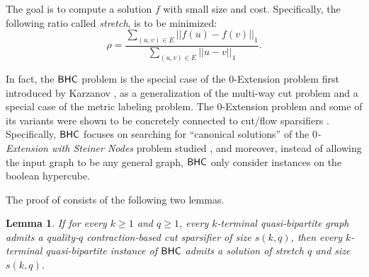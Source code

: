 \documentclass[11pt]{article}
\newtheorem{lemma}[theorem]{Lemma}
\theoremstyle{definition}
\begin{document}
The goal is to compute a solution $f$ with small size and cost. Specifically, the following ratio called \emph{stretch}, is to be minimized:
\[\rho=\frac{\sum_{(u,v)\in E}||f(u)-f(v)||_1}{\sum_{(u,v)\in E}||u-v||_1}.\]

In fact, the $\textnormal{\textsf{BHC}}$ problem is the special case of the $0$-Extension problem first introduced by Karzanov \cite{karzanov1998minimum}, as a generalization of the multi-way cut problem and a special case of the metric labeling problem.
The $0$-Extension problem and some of its variants were shown to be concretely connected to cut/flow sparsifiers \cite{moitra2009approximation,leighton2010extensions,andoni2014towards,chen2024lower,chen20241+}. Specifically, $\textnormal{\textsf{BHC}}$ focuses on searching for ``canonical solutions'' of the \emph{$0$-Extension with Steiner Nodes} problem studied \cite{chen2024lower}, and moreover, instead of allowing the input graph to be any general graph, $\textnormal{\textsf{BHC}}$ only consider instances on the boolean hypercube.


The proof of  consists of the following two lemmas.

\begin{lemma}
If for every $k\ge 1$ and $q\ge 1$, every $k$-terminal quasi-bipartite graph admits a quality-$q$ contraction-based cut sparsifier of size $s(k,q)$, then every $k$-terminal quasi-bipartite instance of $\textnormal{\textsf{BHC}}$ admits a solution of stretch $q$ and size $s(k,q)$.
\end{lemma}
\end{document}
